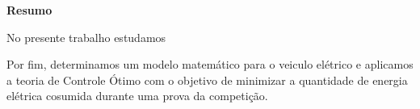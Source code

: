 
\begin{center}
\huge{{\bf Resumo}}
\vspace{2cm}
\end{center}

 


No presente trabalho estudamos

Por fim, determinamos um modelo matemático para o veiculo elétrico e 
aplicamos a teoria de Controle Ótimo com o objetivo de minimizar a quantidade
de energia elétrica cosumida durante uma prova da competição.
 
\clearpage
\thispagestyle{empty}
\cleardoublepage

